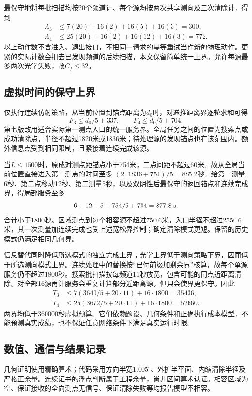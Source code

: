 \documentclass[UTF8,a4paper,zihao=-4,fontset=windows]{ctexart}
\begin{document}
最保守地将每批扫描均按20个频道计、每个源均按两次共享测向及三次清除计，得到
\begin{align}
A_3&\le7(20)+16(2)+16(5)+16(3)=300,\\
A_4&\le25(20)+16(2)+16(12)+16(3)=772.
\end{align}
以上动作数不含进入、退出接口，不把同一请求的幂等重试当作新的物理动作。更紧的实际计数会扣去已发现频道的后续扫描，本文保留简单统一上界。允许每源最多两次光学失败，故$C_f\le32$。

\subsection{虚拟时间的保守上界}
仅执行连续仿射策略，从当前位置到锚点距离为$d_0$时，对递推距离界逐轮求和可得
\[
F_3\le d_0/5+337,\qquad F_4\le d_0/5+704.
\]
第七版改用适合实际第一测点入口的统一服务界。全局任务之间的位置为搜索点或成功清除点，半径不超过1820米或1836米；待处理源的发现锚点也在该范围内。额外信息点受到相同限制，且紧接着连续完成该源。

当$L\le1500$时，原成对测点距锚点小于754米，二点间距不超过60米。故从全局当前位置直接进入第一测点的时间至多
$(2\cdot1836+754)/5=885.2$秒。给第一测量6秒、第二点移动12秒、第二测量5秒，以及双阴性后最保守的返回锚点和连续完成界，得局部服务至多
\[
6+12+5+754/5+704=877.8\ {\rm s}.
\]
合计小于1800秒。区域测点到每个相容源不超过750.6米，入口半径不超过2550.6米，其一次测量加连续完成也受上述宽松界控制；确定清除模式更短。保留的历史模式仍满足相同几何界。

信息替代同时降低所选模式的独立完成上界；光学上界低于测向策略下界，因而低于所选测向模式上界。连续处理中的替换按“已付前缀加剩余界”核算，故每个单源服务仍不超过1800秒。搜索批扫描按每频道11秒放宽，包含可能的同点近距离清除。对全部16源再计服务会重复计算部分近距离源，但只会使界更保守。因此
\begin{align}
T_3&\le 7(3640/5+20\cdot11)+16\cdot1800=35436,\\
T_4&\le 25(3672/5+20\cdot11)+16\cdot1800=52660.
\end{align}
两界均低于360000秒虚拟预算。它们依赖题设、几何条件和正确执行成本模型，不能预测真实成绩，也不保证任意网络条件下满足真实运行时限。

\subsection{数值、通信与结果记录}
几何证明使用精确算术；代码采用方向半宽$1.005^\circ$、外扩半平面、内缩清除半径及严格正余量。连续证书的浮点判断属于工程余量，尚非区间算术认证。相容区域为空、保证接收的全向测点无信号、保证清除失败等均报告模型不相容。
\end{document}
